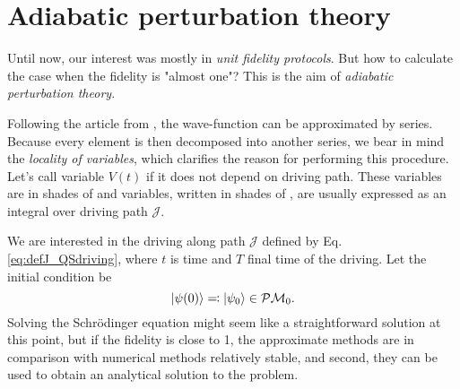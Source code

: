 \section{Adiabatic perturbation theory}
Until now, our interest was mostly in \emph{unit fidelity protocols}. But how to calculate the case when the fidelity is "almost one"? This is the aim of \emph{adiabatic perturbation theory}.


Following the article from \cite{Rigolin2008}, the wave-function can be approximated by series. Because every element is then decomposed into another series, we bear in mind the \emph{locality of variables}, which clarifies the reason for performing this procedure. Let's call variable $V(t)$ \emph{} if it does not depend on driving path. These variables are in shades of  and  variables, written in shades of , are usually expressed as an integral over driving path $\mathcal J$.

We are interested in the driving along path $\mathcal J$ defined by Eq. \ref{eq:defJ_QSdriving},
where $t$ is time and $T$ final time of the driving. Let the initial condition be
\begin{equation}
    \ket{\psi(0)}\eqqcolon\ket{\psi_0}\in \mathcal{P}\mathcal{M}_0.
\end{equation}
Solving the Schr\"odinger equation might seem like a straightforward solution at this point, but if the fidelity is close to 1, the approximate methods are in comparison with numerical methods relatively stable, and second, they can be used to obtain an analytical solution to the problem.

